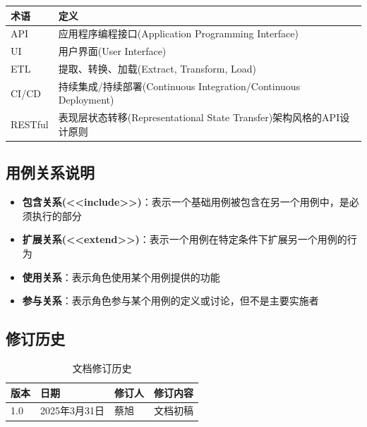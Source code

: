 \documentclass[a4paper,12pt]{article}
\begin{document}
\begin{longtable}{|p{3cm}|p{12cm}|}
\hline
\textbf{术语} & \textbf{定义} \\
\hline
\endhead
API & 应用程序编程接口(Application Programming Interface) \\
\hline
UI & 用户界面(User Interface) \\
\hline
ETL & 提取、转换、加载(Extract, Transform, Load) \\
\hline
CI/CD & 持续集成/持续部署(Continuous Integration/Continuous Deployment) \\
\hline
RESTful & 表现层状态转移(Representational State Transfer)架构风格的API设计原则 \\
\hline
\end{longtable}

\subsection{用例关系说明}

\begin{itemize}
  \item \textbf{包含关系(<<include>>)}：表示一个基础用例被包含在另一个用例中，是必须执行的部分
  \item \textbf{扩展关系(<<extend>>)}：表示一个用例在特定条件下扩展另一个用例的行为
  \item \textbf{使用关系}：表示角色使用某个用例提供的功能
  \item \textbf{参与关系}：表示角色参与某个用例的定义或讨论，但不是主要实施者
\end{itemize}

\subsection{修订历史}

\begin{table}[htbp]
\centering
\begin{tabular}{llll}
\toprule
\textbf{版本} & \textbf{日期} & \textbf{修订人} & \textbf{修订内容} \\
\midrule
1.0 & 2025年3月31日 & 蔡旭 & 文档初稿 \\
\bottomrule
\end{tabular}
\caption{文档修订历史}
\end{table}
\end{document}
